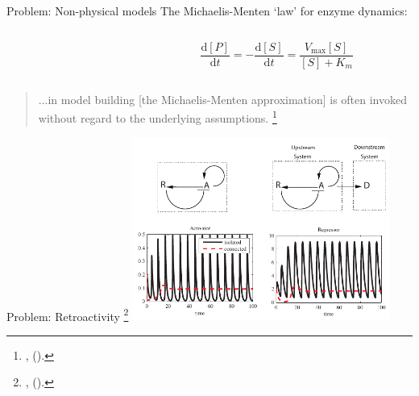 \documentclass[11pt,reqno]{beamer}
\newcommand{\D}[2]{\frac{\mathrm{d} #1}{\mathrm{d} #2}}
\newcommand{\fcite}[1]{
\footnote{\cite{#1}, (\citeyear{#1}).}
}
\begin{document}
\begin{frame}{Problem: Non-physical models}
The Michaelis-Menten `law' for enzyme dynamics:
\begin{columns}
	\begin{column}{0.45\linewidth}
	\end{column}
	\begin{column}{0.45\linewidth}
		\[
		\D{[P]}{t}= - \D{[S]}{t} = \frac{V_\text{max}[S]}{[S] + K_m}
		\]
	\end{column}
\end{columns}
\vfill

\begin{block}{}
	\begin{quote}
		...in model building [the Michaelis-Menten approximation] is often invoked without regard to the underlying assumptions.\fcite{Keener2009}
	\end{quote}
\end{block}
\end{frame}
\begin{frame}{Problem: Retroactivity\fcite{DelVecchio2013}}
\includegraphics[height=6cm]{activator-repressor-ddv}
\end{frame}
\end{document}
